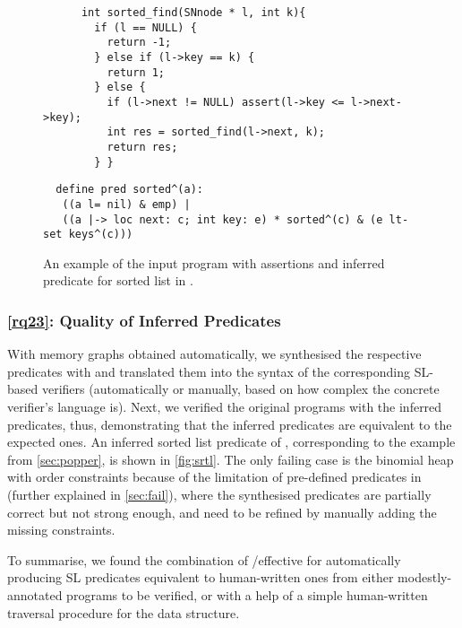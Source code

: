 \begin{figure}[b]
  \begin{verbatim}
      int sorted_find(SNnode * l, int k){
        if (l == NULL) {
          return -1;
        } else if (l->key == k) {
          return 1;
        } else {
          if (l->next != NULL) assert(l->key <= l->next->key);
          int res = sorted_find(l->next, k);
          return res;
        } }
  \end{verbatim}
  
  \vspace{5pt}  
  
  \begin{verbatim}
  define pred sorted^(a): 
   ((a l= nil) & emp) | 
   ((a |-> loc next: c; int key: e) * sorted^(c) & (e lt-set keys^(c)))
  \end{verbatim}
  \caption{An example of the input program with assertions and
    inferred predicate for sorted list in \vcdryad.}
    \label{fig:srtl}
    \end{figure}

\subsubsection*{\ref{rq23}: Quality of Inferred Predicates}



With memory graphs obtained automatically, we synthesised the
respective predicates with \tool and translated them into the syntax
of the corresponding SL-based verifiers (automatically or manually,
based on how complex the concrete verifier's language is).
%
Next, we verified the original programs with the inferred predicates,
thus, demonstrating that the inferred predicates are equivalent to the
expected ones.
%
An inferred sorted list predicate of \vcdryad, corresponding to the
example from \autoref{sec:popper}, is shown in \autoref{fig:srtl}. The
only failing case is the binomial heap with order constraints because
of the limitation of pre-defined predicates in \tool (further
explained in \autoref{sec:fail}), where the synthesised predicates are
partially correct but not strong enough, and need to be refined by
manually adding the missing constraints.



To summarise, we found the combination of \ggen/\tool effective for
automatically producing SL predicates equivalent to human-written ones
from either modestly-annotated programs to be verified, or with a help
of a simple human-written traversal procedure for the data structure.

